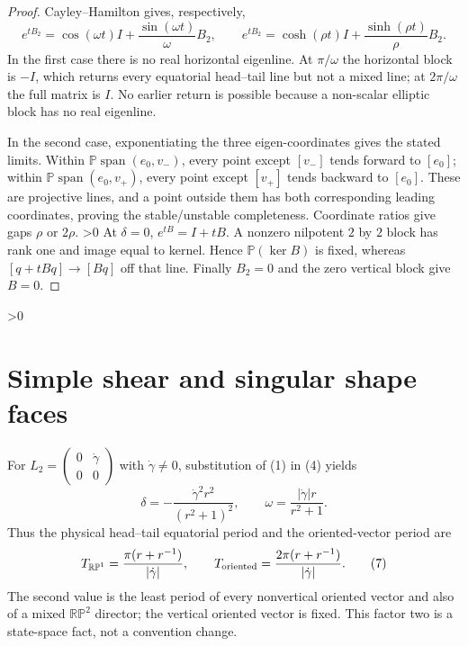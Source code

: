 \documentclass[10pt]{article}
\providecommand{\CRevisionRound}{2}
\newcommand{\RP}{\mathbb{RP}}
\newcommand{\Span}{\operatorname{span}}
\begin{document}
\begin{proof}
Cayley--Hamilton gives, respectively,
\[
 e^{tB_2}=\cos(\omega t)I+\frac{\sin(\omega t)}{\omega}B_2,\qquad
 e^{tB_2}=\cosh(\rho t)I+\frac{\sinh(\rho t)}{\rho}B_2. \tag{5}
\]
In the first case there is no real horizontal eigenline.  At $\pi/\omega$ the
horizontal block is $-I$, which returns every equatorial head--tail line but
not a mixed line; at $2\pi/\omega$ the full matrix is $I$.  No earlier return
is possible because a non-scalar elliptic block has no real eigenline.

In the second case, exponentiating the three eigen-coordinates gives the stated
limits.  Within $\mathbb P\Span(e_0,v_-)$, every point except $[v_-]$ tends
forward to $[e_0]$; within $\mathbb P\Span(e_0,v_+)$, every point except
$[v_+]$ tends backward to $[e_0]$.  These are projective lines, and a point
outside them has both corresponding leading coordinates, proving the
stable/unstable completeness.  Coordinate ratios give gaps $\rho$ or $2\rho$.
\ifnum\CRevisionRound>0
At $\delta=0$, $e^{tB}=I+tB$.  A nonzero nilpotent $2$ by $2$ block has rank
one and image equal to kernel.  Hence $\mathbb P(\ker B)$ is fixed, whereas
$[q+tBq]\to[Bq]$ off that line.  Finally $B_2=0$ and the zero vertical block
give $B=0$.
\fi
\end{proof}

\ifnum\CRevisionRound>0
\section{Simple shear and singular shape faces}
For $L_2=\left(\begin{smallmatrix}0&\dot\gamma\\0&0\end{smallmatrix}\right)$
with $\dot\gamma\ne0$,
substitution of (1) in (4) yields
\begin{equation}
 \delta=-\frac{\dot\gamma^2r^2}{(r^2+1)^2},\qquad
 \omega=\frac{|\dot\gamma|r}{r^2+1}. \tag{6}
\end{equation}
Thus the physical head--tail equatorial period and the oriented-vector period
are
\begin{equation}
 T_{\RP^1}=\frac{\pi(r+r^{-1})}{|\dot\gamma|},\qquad
 T_{\rm oriented}=\frac{2\pi(r+r^{-1})}{|\dot\gamma|}. \tag{7}
\end{equation}
The second value is the least period of every nonvertical oriented vector and
also of a mixed $\RP^2$ director; the vertical oriented vector is fixed.  This
factor two is a state-space fact, not a convention change.
\end{document}
